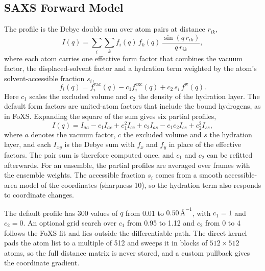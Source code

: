 \subsection{SAXS Forward Model}
\label{app:biofeat-saxs}
\label{sec:biofeat-saxs-fft}

The profile is the Debye double sum over atom pairs at distance $r_{ik}$,
\begin{equation}
    I(q)=\sum_i\sum_k f_i(q)\,f_k(q)\,\frac{\sin(q\,r_{ik})}{q\,r_{ik}},
    \label{eq:biofeat-debye}
\end{equation}
where each atom carries one effective form factor that combines the vacuum factor, the displaced-solvent factor and a hydration term weighted by the atom's solvent-accessible fraction $s_i$,
\begin{equation}
    f_i(q)=f_i^{\mathrm{vac}}(q)-c_1f_i^{\mathrm{exc}}(q)+c_2\,s_i\,f^{\mathrm{w}}(q).
    \label{eq:biofeat-saxs-ff}
\end{equation}
Here $c_1$ scales the excluded volume and $c_2$ the density of the hydration layer.\supercite{schneidman-duhovnyFoXSWebServer2010} The default form factors are united-atom factors that include the bound hydrogens, as in FoXS. Expanding the square of the sum gives six partial profiles,
\begin{equation}
    I(q)=I_{aa}-c_1I_{ac}+c_1^2I_{cc}+c_2I_{as}-c_1c_2I_{cs}+c_2^2I_{ss},
    \label{eq:biofeat-saxs-six}
\end{equation}
where $a$ denotes the vacuum factor, $c$ the excluded volume and $s$ the hydration layer, and each $I_{xy}$ is the Debye sum with $f_x$ and $f_y$ in place of the effective factors. The pair sum is therefore computed once, and $c_1$ and $c_2$ can be refitted afterwards. For an ensemble, the partial profiles are averaged over frames with the ensemble weights. The accessible fraction $s_i$ comes from a smooth accessible-area model of the coordinates (sharpness 10), so the hydration term also responds to coordinate changes.

The default profile has 300 values of $q$ from 0.01 to $0.50\,\text{\AA}^{-1}$, with $c_1=1$ and $c_2=0$. An optional grid search over $c_1$ from 0.95 to 1.12 and $c_2$ from 0 to 4 follows the FoXS fit and lies outside the differentiable path. The direct kernel pads the atom list to a multiple of 512 and sweeps it in blocks of $512\times512$ atoms, so the full distance matrix is never stored, and a custom pullback gives the coordinate gradient.


